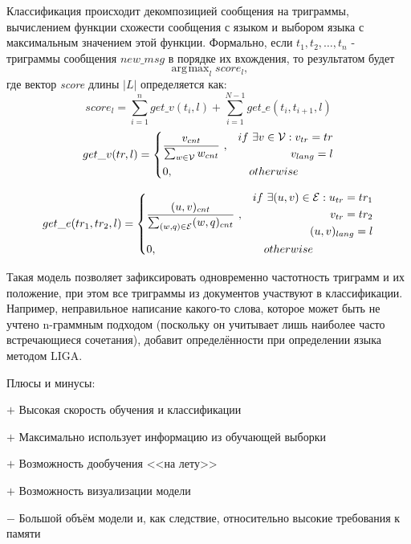 \documentclass[a4paper, 14pt]{article}
\DeclareMathOperator*{\argmax}{\arg\!\max}
\begin{document}
		Классификация происходит декомпозицией сообщения на триграммы, вычислением функции схожести сообщения с языком и
		выбором языка с максимальным значением этой функции. Формально, если
		$t_{1}, t_{2}, \ldots, t_{n}$ - триграммы сообщения $new\_msg$ в порядке их вхождения, то результатом будет
		$$ \argmax_{l} score_{l} ,$$
		где вектор \textit{score} длины $|L|$ определяется как:
		$$ score_{l} = \sum_{i=1}^{n} get\_v(t_{i}, l) + \sum_{i=1}^{N-1} get\_e(t_{i}, t_{i+1}, l)$$
		\[
 		get\_v(tr, l) =
 		  \begin{dcases}
  		   \frac{v_{cnt}}{\sum_{w \in \mathcal{V}} w_{cnt}} \ , & 
  		   \begin{split} 
					 if \ \exists v \in \mathcal{V}: v_{tr}=tr \\ v_{lang}=l	
  		   	\end{split} \\
  		   0, & \quad otherwise
  		 \end{dcases}
		\]		
		
		\[
 		get\_e(tr_1, tr_2, l) =
 		  \begin{dcases}
  		   \frac{(u, v)_{cnt}}{\sum_{(w, q) \in \mathcal{E}} (w, q)_{cnt}} \ , & 
  		    \begin{split} 
					 if \ \exists (u, v) \in \mathcal{E}:  u_{tr}=tr_1 \\ v_{tr}=tr_2 \\ (u, v)_{lang}=l
  		   	\end{split} \\
  		   0, & \quad otherwise
  		 \end{dcases}
		\]	
		
		Такая модель позволяет зафиксировать одновременно частотность триграмм и их положение, при этом все триграммы
		из документов участвуют в классификации. Например, неправильное написание какого-то слова, которое может быть не учтено n-граммным подходом (поскольку он
		учитывает лишь наиболее часто встречающиеся сочетания), добавит определённости при определении языка методом LIGA.		
		
		\noindent Плюсы и минусы:
		
		$+$ Высокая скорость обучения и классификации
		
		$+$ Максимально использует информацию из обучающей выборки
		
		$+$ Возможность дообучения <<на лету>>
		
		$+$ Возможность визуализации модели
		
		$-$ Большой объём модели и, как следствие, относительно высокие требования к памяти
			
\end{document}

